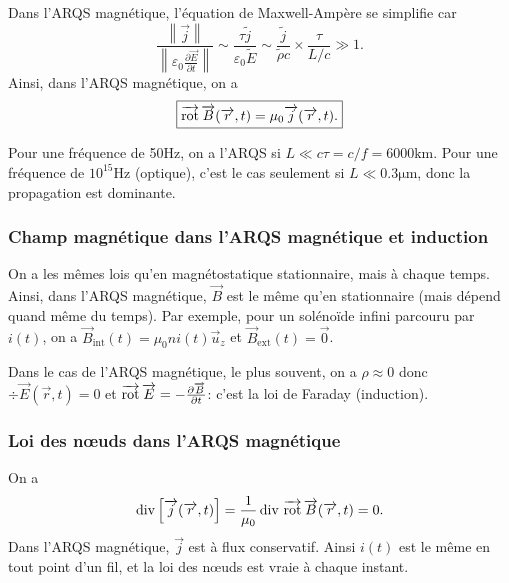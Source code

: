 Dans l'ARQS magnétique, l'équation de Maxwell-Ampère se simplifie car
\begin{equation*}
    \frac{\left\lVert\vec{j}\right\rVert}{\left\lVert\varepsilon_0\frac{\partial\vec{E}}{\partial t}\right\rVert}\sim\frac{\tau\tilde{j}}{\varepsilon_0\tilde{E}}\sim\frac{\tilde{j}}{\tilde{\rho}c}\times\frac{\tau}{L/c}\gg 1.
\end{equation*}
Ainsi, dans l'ARQS magnétique, on a 
\begin{equation*}
    \boxed{
        \operatorname{\overrightarrow{\text{rot}}}\protect\overrightarrow{{B}}(\protect\overrightarrow{{r}},t)=\mu_0\protect\overrightarrow{{j}}(\protect\overrightarrow{{r}},t).
    }
\end{equation*}

Pour une fréquence de 50$\si{\hertz}$, on a l'ARQS si $L\ll c\tau=c/f=6000\si{\kilo\metre}$. Pour une fréquence de $10^{15}\si{\hertz}$ (optique), c'est le cas seulement si $L\ll0.3\si{\micro\metre}$, donc la propagation est dominante.

\subsubsection{Champ magnétique dans l'ARQS magnétique et induction}

On a les mêmes lois qu'en magnétostatique stationnaire, mais à chaque temps. Ainsi, dans l'ARQS magnétique, $\vec{B}$ est le même qu'en stationnaire (mais dépend quand même du temps). Par exemple, pour un solénoïde infini parcouru par $i(t)$, on a $\vec{B}_{\mathrm{int}}(t)=\mu_0 ni(t)\vec{u}_z$ et $\vec{B}_{\mathrm{ext}}(t)=\vec{0}$.

Dans le cas de l'ARQS magnétique, le plus souvent, on a $\rho\approx0$ donc $\div\vec{E}(\vec{r},t)=0$ et $\operatorname{\overrightarrow{\text{rot}}}\protect\overrightarrow{{E}}=-\frac{\partial\protect\overrightarrow{{B}}}{\partial t}$: c'est la loi de Faraday (induction).

\subsubsection{Loi des n\oe uds dans l'ARQS magnétique}

On a 
\begin{equation*}
    \operatorname{div}\left[\protect\overrightarrow{{j}}(\protect\overrightarrow{{r}},t)\right]=\frac{1}{\mu_0}\operatorname{div}\,\operatorname{\overrightarrow{\text{rot}}}\protect\overrightarrow{{B}}(\protect\overrightarrow{{r}},t)=0.
\end{equation*}
Dans l'ARQS magnétique, $\vec{j}$ est à flux conservatif. Ainsi $i(t)$ est le même en tout point d'un fil, et la loi des n\oe uds est vraie à chaque instant.